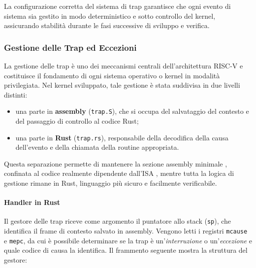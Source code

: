 \documentclass[italian, Lau, oneside]{sapthesis} %
\begin{document}
La configurazione corretta del sistema di trap garantisce che ogni evento di sistema sia gestito in modo deterministico e sotto controllo del kernel, assicurando stabilità durante le fasi successive di sviluppo e verifica.

\subsubsection*{Gestione delle Trap ed Eccezioni}

La gestione delle trap è uno dei meccanismi centrali dell’architettura RISC-V e costituisce il fondamento di ogni sistema operativo o kernel in modalità privilegiata.  
Nel kernel sviluppato, tale gestione è stata suddivisa in due livelli distinti:

\begin{itemize}
    \item una parte in \textbf{assembly} (\texttt{trap.S}), che si occupa del salvataggio del contesto e del passaggio di controllo al codice Rust;
    \item una parte in \textbf{Rust} (\texttt{trap.rs}), responsabile della decodifica della causa dell’evento e della chiamata della routine appropriata.
\end{itemize}

Questa separazione permette di mantenere la sezione assembly minimale , confinata al codice realmente dipendente dall’ISA , mentre tutta la logica di gestione rimane in Rust, linguaggio più sicuro e facilmente verificabile.

\paragraph{Handler in Rust}
Il gestore delle trap riceve come argomento il puntatore allo stack (\texttt{sp}), che identifica il frame di contesto salvato in assembly.  
Vengono letti i registri \texttt{mcause} e \texttt{mepc}, da cui è possibile determinare se la trap è un’\emph{interruzione} o un’\emph{eccezione} e quale codice di causa la identifica.  
Il frammento seguente mostra la struttura del gestore:
\end{document}
